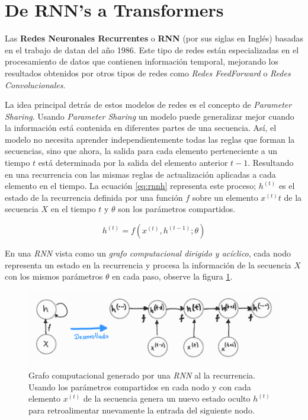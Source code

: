 \section{De RNN's a Transformers}

Las \textbf{Redes Neuronales Recurrentes} o \textbf{RNN} (por sus siglas en Inglés) basadas en el
trabajo de \citeauthor{Rumelhart} datan del año 1986. Este tipo de redes están especializadas
en el procesamiento de datos que contienen información temporal, mejorando los resultados obtenidos
por otros tipos de redes como \textit{Redes FeedForward} o \textit{Redes Convolucionales}.

La idea principal detrás de estos modelos de redes es el concepto de \textit{Parameter Sharing}.
Usando \textit{Parameter Sharing} un modelo puede generalizar mejor cuando la información
está contenida en diferentes partes de una secuencia. Así, el modelo no necesita aprender
independientemente todas las reglas que forman la secuencias, sino que ahora, la salida para cada
elemento perteneciente a un tiempo $t$ está determinada por la salida del elemento anterior $t-1$.
Resultando en una recurrencia con las mismas reglas de actualización aplicadas a cada elemento en el tiempo.
La ecuación \ref{eq:rnnh} representa este proceso; $h^{(t)}$ es el estado de la recurrencia definida
por una función $f$ sobre un elemento $x^{(t)}t$ de la secuencia $X$ en el tiempo $t$ y $\theta$ son
los parámetros compartidos.

\begin{equation}
    h^{(t)} = f(x^{(t)}, h^{(t-1)}; \theta)
    \label{eq:rnnh}
\end{equation}

En una \textit{RNN} vista como un \textit{grafo computacional dirigido y acíclico}, cada nodo
representa un estado en la recurrencia y procesa la información de la secuencia $X$ con los mismos
parámetros $\theta$ en cada paso, observe la figura \ref{fig:rnn_cg}.

\begin{figure}[!ht]
\centering
\includegraphics[width=.8\textwidth]{Chapters/2. Transformer/Figures/rnn/rnn_cgraph.png}
\caption[RNN - Grafo Computacional]{Grafo computacional generado por una \textit{RNN} al
         la recurrencia. Usando los parámetros compartidos en cada nodo
        y con cada elemento $x^{(t)}$ de la secuencia genera un nuevo estado oculto $h^{(t)}$
        para retroalimentar nuevamente la entrada del siguiente nodo.}
\label{fig:rnn_cg}
\end{figure}

